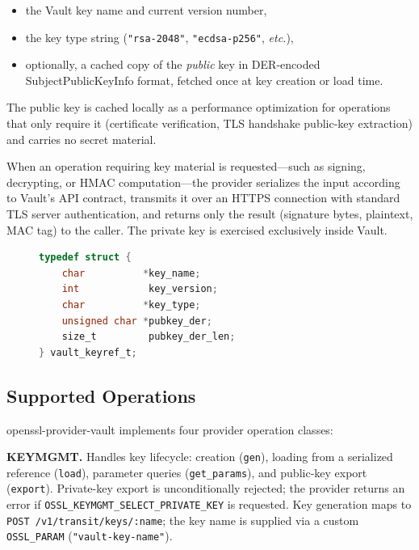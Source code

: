 \documentclass[sigconf,10pt]{acmart}
\begin{document}
\begin{itemize}
  \item the Vault key name and current version number,
  \item the key type string (\texttt{"rsa-2048"}, \texttt{"ecdsa-p256"},
        \textit{etc.}),
  \item optionally, a cached copy of the \emph{public} key in DER-encoded
        SubjectPublicKeyInfo format, fetched once at key creation or load time.
\end{itemize}

The public key is cached locally as a performance optimization for operations
that only require it (certificate verification, TLS handshake public-key
extraction) and carries no secret material.

When an operation requiring key material is requested---such as signing,
decrypting, or HMAC computation---the provider serializes the input according
to Vault's API contract, transmits it over an HTTPS connection with standard
TLS server authentication, and returns only the result (signature bytes,
plaintext, MAC tag) to the caller.  The private key is exercised exclusively
inside Vault.

\begin{figure}[t]
  \centering
  \begin{lstlisting}[language=C,caption={Key reference structure.},
                     label={lst:keyref}]
typedef struct {
    char          *key_name;
    int            key_version;
    char          *key_type;
    unsigned char *pubkey_der;
    size_t         pubkey_der_len;
} vault_keyref_t;
  \end{lstlisting}
\end{figure}

\subsection{Supported Operations}

openssl-provider-vault implements four provider operation classes:

\textbf{KEYMGMT.}  Handles key lifecycle: creation (\texttt{gen}), loading
from a serialized reference (\texttt{load}), parameter queries
(\texttt{get\_params}), and public-key export (\texttt{export}).  Private-key
export is unconditionally rejected; the provider returns an error if
\texttt{OSSL\_KEYMGMT\_SELECT\_PRIVATE\_KEY} is requested.  Key generation
maps to \texttt{POST /v1/transit/keys/:name}; the key name is supplied via a
custom \texttt{OSSL\_PARAM} (\texttt{"vault-key-name"}).
\end{document}
